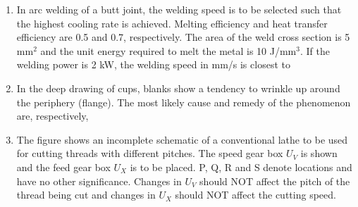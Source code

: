 \documentclass[journal,12pt,onecolumn]{IEEEtran}
\begin{document}
\begin{enumerate}[resume]
    \item In arc welding of a butt joint, the welding speed is to be selected such that the highest cooling rate is achieved. Melting efficiency and heat transfer efficiency are 0.5 and 0.7, respectively. The area of the weld cross section is 5 mm$^2$ and the unit energy required to melt the metal is 10 J/mm$^3$. If the welding power is 2 kW, the welding speed in mm/s is closest to\\

          \begin{enumerate}
          \end{enumerate}

    \item In the deep drawing of cups, blanks show a tendency to wrinkle up around the periphery (flange). The most likely cause and remedy of the phenomenon are, respectively,\\

          \begin{enumerate}
          \end{enumerate}

    \item The figure shows an incomplete schematic of a conventional lathe to be used for cutting threads with different pitches. The speed gear box $U_V$ is shown and the feed gear box $U_X$ is to be placed. P, Q, R and S denote locations and have no other significance. Changes in $U_V$ should NOT affect the pitch of the thread being cut and changes in $U_X$ should NOT affect the cutting speed.


\end{enumerate}
\end{document}
